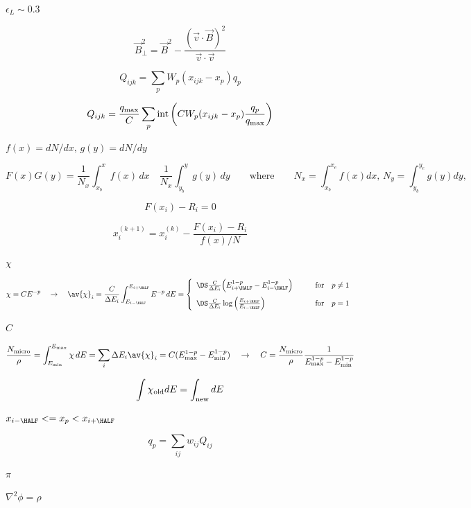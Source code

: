 \documentclass{article}
\begin{document}
$\epsilon_L\sim 0.3$
\pagebreak

\[ \vec{B}^2_\perp = \vec{B}^2 - \frac{(\vec{v}\cdot\vec{B})^2}
                                    {\vec{v}\cdot\vec{v}}                                
\]
\pagebreak

\[   Q_{ijk} = \sum_p W_p(x_{ijk}-x_p)q_p
\]
\pagebreak

\[   Q_{ijk} = \frac{q_{\max}}{C} \sum_p {\rm int}\left(C
             W_p(x_{ijk}-x_p) \frac{q_p}{q_{\max}}\right)
\]
\pagebreak

$ f(x) = dN/dx,\,g(y) = dN/dy $
\pagebreak

\[   F(x)G(y) = \frac{1}{N_x}\int_{x_b}^{x} f(x)\,dx\quad
              \frac{1}{N_x}\int_{y_b}^{y} g(y)\,dy
   \qquad\mathrm{where}\qquad
   N_x = \int_{x_b}^{x_e} f(x) dx,\,
   N_y = \int_{y_b}^{y_e} g(y) dy,\,
\]
\pagebreak

\[   F(x_i) - R_i = 0
\]
\pagebreak

\[     x_i^{(k+1)} = x_i^{(k)} - \frac{F(x_i) - R_i}{f(x)/N} 
\]
\pagebreak

$ \chi $
\pagebreak

\[    \chi = CE^{-p}\quad\rightarrow\quad
    \av{\chi}_i = \frac{C}{\Delta E_i}
                  \int_{E_{i-\HALF}}^{E_{i+\HALF}} E^{-p}\, dE
                        =
    \left\{\begin{array}{ll}
       \DS \frac{C}{\Delta E_i}
          \Big(E^{1-p}_{i+\HALF} - E^{1-p}_{i-\HALF}\Big)
       & \qquad {\rm for} \quad p \ne 1
       \\ \noalign{\medskip}
       \DS \frac{C}{\Delta E_i}
            \log\left(\frac{E_{i+\HALF}}{E_{i-\HALF}}\right)
       & \qquad {\rm for} \quad p = 1
    \end{array}\right.
\]
\pagebreak

$ C $
\pagebreak

\[  \frac{N_{\rm micro}}{\rho} = \int_{E_{\min}}^{E_{\max}} \chi\, dE = \sum_i \Delta E_i\av{\chi}_i
    = C (E_{\max}^{1-p} - E_{\min}^{1-p})
    \quad\rightarrow\quad
    C = \frac{N_{\rm micro}}{\rho}\frac{1}{E_{\max}^{1-p} - E_{\min}^{1-p}}
\]
\pagebreak

\[ \int \chi_{\rm old} dE = \int_{\rm new} dE \]
\pagebreak

$ x_{i-\HALF} <= x_p < x_{i+\HALF} $
\pagebreak

\[     q_p = \sum_{ij} w_{ij} Q_{ij}
\]
\pagebreak

$ \pi $
\pagebreak

$ \nabla^2\phi = \rho $
\pagebreak
\end{document}
